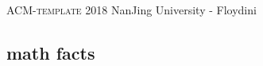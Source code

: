 \documentclass[a4paper]{amsart}
\begin{document}
	\thispagestyle{fancy}
	\begin{center}
		\Huge\textsc{ACM-template 2018}
		\vspace{0.35cm}
		\huge NanJing University - Floydini
		\vspace{0.35cm}
	\end{center}
	\begin{multicols}{2}
		\tableofcontents
	\end{multicols}
\newpage
	\begin{multicols}{2}
    \newpage
	\section{math facts}
    
	\end{multicols}
\end{document}
